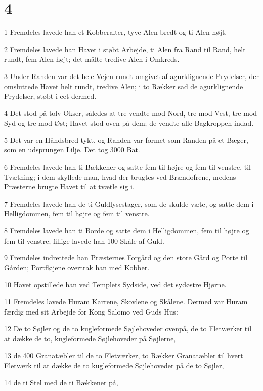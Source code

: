 \chapter{4}

\par 1 Fremdeles lavede han et Kobberalter, tyve Alen bredt og ti Alen højt.
\par 2 Fremdeles lavede han Havet i støbt Arbejde, ti Alen fra Rand til Rand, helt rundt, fem Alen højt; det målte tredive Alen i Omkreds.
\par 3 Under Randen var det hele Vejen rundt omgivet af agurklignende Prydelser, der omsluttede Havet helt rundt, tredive Alen; i to Rækker sad de agurklignende Prydelser, støbt i eet dermed.
\par 4 Det stod på tolv Okser, således at tre vendte mod Nord, tre mod Vest, tre mod Syd og tre mod Øst; Havet stod oven på dem; de vendte alle Bagkroppen indad.
\par 5 Det var en Håndsbred tykt, og Randen var formet som Randen på et Bæger, som en udsprungen Lilje. Det tog 3000 Bat.
\par 6 Fremdeles lavede han ti Bækkener og satte fem til højre og fem til venstre, til Tvætning; i dem skyllede man, hvad der brugtes ved Brændofrene, medens Præsterne brugte Havet til at tvætle sig i.
\par 7 Fremdeles lavede han de ti Guldlysestager, som de skulde væte, og satte dem i Helligdommen, fem til højre og fem til venstre.
\par 8 Fremdeles lavede han ti Borde og satte dem i Helligdommen, fem til højre og fem til venstre; fillige lavede han 100 Skåle af Guld.
\par 9 Fremdeles indrettede han Præsternes Forgård og den store Gård og Porte til Gården; Portfløjene overtrak han med Kobber.
\par 10 Havet opstillede han ved Templets Sydside, ved det sydøstre Hjørne.
\par 11 Fremdeles lavede Huram Karrene, Skovlene og Skålene. Dermed var Huram færdig med sit Arbejde for Kong Salomo ved Guds Hus:
\par 12 De to Søjler og de to kugleformede Søjlehoveder ovenpå, de to Fletværker til at dække de to, kugleformede Søjlehoveder på Søjlerne,
\par 13 de 400 Granatæbler til de to Fletværker, to Rækker Granatæbler til hvert Fletværk til at dække de to kugleformede Søjlehoveder på de to Søjler,
\par 14 de ti Stel med de ti Bækkener på,
